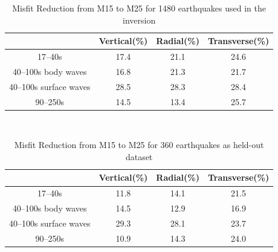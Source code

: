 \documentclass[extra,mreferee]{gji}
\begin{document}
\begin{table}[!htb]
  \centering
  \begin{tabular}{|c|c|c|c|}
    \hline
    ~          &  Vertical(\%) & Radial(\%) &  Transverse(\%) \\
    \hline
    17--40s                &   17.4   &       21.1 &       24.6 \\
    40--100s body waves    &   16.8   &       21.3 &       21.7 \\
    40--100s surface waves &   28.5   &       28.3 &       28.4 \\
    90--250s               &   14.5   &       13.4 &       25.7 \\
    \hline
  \end{tabular}\\
  \label{table:misfit_reduction_M15_M25}
  \caption{Misfit Reduction from M15 to M25 for 1480 earthquakes used in the inversion}
\end{table}

\begin{table}[!htb]
  \centering
  \begin{tabular}{|c|c|c|c|}
  \hline
  ~          &  Vertical(\%) & Radial(\%) &  Transverse(\%) \\
  \hline
  17--40s                &          11.8 &       14.1 &       21.5 \\
  40--100s body waves    &          14.5 &       12.9 &       16.9 \\
  40--100s surface waves &          29.3 &       28.1 &       23.7 \\
  90--250s               &          10.9 &       14.3 &       24.0 \\
  \hline
  \end{tabular}\\
  \caption{Misfit Reduction from M15 to M25 for 360 earthquakes as held-out dataset}
  \label{table:misfit_reduction_M15_M25_360}
\end{table}
\end{document}
